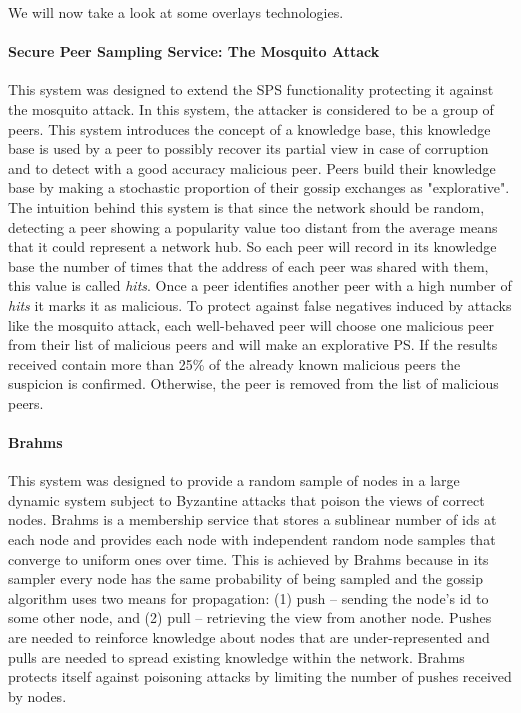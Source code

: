 We will now take a look at some overlays technologies.

\paragraph*{\textbf{Secure Peer Sampling Service: The Mosquito Attack} \cite{jesi2009secure}} This system was designed to extend the SPS functionality protecting it against the mosquito attack. In this system, the attacker is considered to be a group of peers. This system introduces the concept of a knowledge base, this knowledge base is used by a peer to possibly recover its partial view in case of corruption and to detect with a good accuracy malicious peer. Peers build their knowledge base by making a stochastic proportion of their gossip exchanges as "explorative". The intuition behind this system is that since the network should be random, detecting a peer showing a popularity value too distant from the average means that it could represent a network hub. So each peer will record in its knowledge base the number of times that the address of each peer was shared with them, this value is called \textit{hits}. Once a peer identifies another peer with a high number of \textit{hits} it marks it as malicious. To protect against false negatives induced by attacks like the mosquito attack, each well-behaved peer will choose one malicious peer from their list of malicious peers and will make an explorative PS. If the results received contain more than 25\% of the already known malicious peers the suspicion is confirmed. Otherwise, the peer is removed from the list of malicious peers.

\paragraph*{\textbf{Brahms} \cite{bortnikov2009brahms}} This system was designed to provide a random sample of nodes in a large dynamic system subject to Byzantine attacks that poison the views of correct nodes. Brahms is a membership service that stores a sublinear number of ids at each node and provides each node with independent random node samples that converge to uniform ones over time. This is achieved by Brahms because in its sampler every node has the same probability of being sampled and the gossip algorithm uses two means for propagation: (1) push – sending the node’s id to some other node, and (2) pull – retrieving the view from another node. Pushes are needed to reinforce knowledge about nodes that are under-represented and pulls are needed to spread existing knowledge within the network. Brahms protects itself against poisoning attacks by limiting the number of pushes received by nodes.

